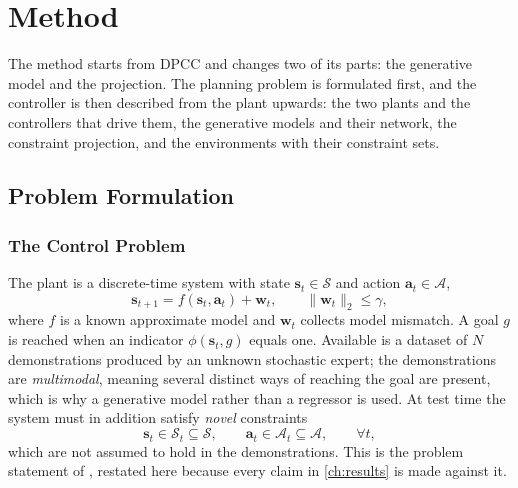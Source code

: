 \documentclass[headsepline,footsepline,footinclude=false,oneside,fontsize=11pt,paper=a4,listof=totoc,bibliography=totoc]{scrbook}
\theoremstyle{definition}
\theoremstyle{plain}
\theoremstyle{remark}
\newcommand{\vect}[1]{\boldsymbol{#1}}
\begin{document}
\chapter{Method}\label{ch:method}

The method starts from \ac{DPCC} and changes two of its parts: the generative model and the projection.
The planning problem is formulated first, and the controller is then described from the plant upwards:
the two plants and the controllers that drive them, the generative models and their network, the
constraint projection, and the environments with their constraint sets.

\section{Problem Formulation}\label{sec:method:formalisation}

\subsection{The Control Problem}

The plant is a discrete-time system with state $\vect{s}_{t}\in\mathcal{S}$ and action
$\vect{a}_{t}\in\mathcal{A}$,
\begin{equation}\label{eq:method:plant}
  \vect{s}_{t+1} = f(\vect{s}_{t},\vect{a}_{t}) + \vect{w}_{t},
  \qquad \|\vect{w}_{t}\|_{2}\le\gamma,
\end{equation}
where $f$ is a known approximate model and $\vect{w}_{t}$ collects model mismatch. A goal
$g$ is reached when an indicator $\phi(\vect{s}_{t},g)$ equals one. Available is a dataset of
$N$ demonstrations produced by an unknown stochastic expert; the demonstrations are
\emph{multimodal}, meaning several distinct ways of reaching the goal are present, which is
why a generative model rather than a regressor is used. At test time the system must in
addition satisfy \emph{novel} constraints
\begin{equation}\label{eq:method:constraints}
  \vect{s}_{t}\in\mathcal{S}_{t}\subseteq\mathcal{S},
  \qquad \vect{a}_{t}\in\mathcal{A}_{t}\subseteq\mathcal{A},
  \qquad \forall t,
\end{equation}
which are not assumed to hold in the demonstrations. This is the problem statement of
\parencite[Sec.~3]{romer2025diffusion}, restated here because every claim in \autoref{ch:results} is made
against it.
\end{document}
